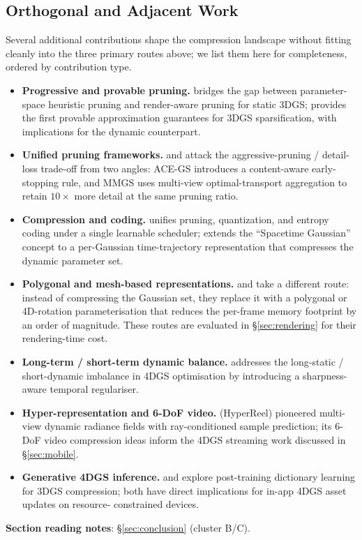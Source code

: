 \subsection{Orthogonal and Adjacent Work}
Several additional contributions shape the compression landscape
without fitting cleanly into the three primary routes above; we
list them here for completeness, ordered by contribution type.
\begin{itemize}
  \item \textbf{Progressive and provable pruning.}
        \cite{chen2026refine} bridges the gap between
        parameter-space heuristic pruning and render-aware pruning
        for static 3DGS; \cite{mousa2026provablepruning} provides
        the first provable approximation guarantees for 3DGS
        sparsification, with implications for the dynamic
        counterpart.
  \item \textbf{Unified pruning frameworks.}
        \cite{zhao2026acegs} and \cite{zhao2026mmgs} attack the
        aggressive-pruning / detail-loss trade-off from two
        angles: ACE-GS introduces a content-aware early-stopping
        rule, and MMGS uses multi-view optimal-transport
        aggregation to retain $10\times$ more detail at the same
        pruning ratio.
  \item \textbf{Compression and coding.}
        \cite{zhang2026geta3dgs} unifies pruning, quantization, and
        entropy coding under a single learnable scheduler;
        \cite{li2024spacetimegaussians} extends the
        ``Spacetime Gaussian'' concept to a per-Gaussian
        time-trajectory representation that compresses the dynamic
        parameter set.
  \item \textbf{Polygonal and mesh-based representations.}
        \cite{hong2026polymerge} and \cite{duan20244drotorgs}
        take a different route: instead of compressing the
        Gaussian set, they replace it with a polygonal or 4D-rotation
        parameterisation that reduces the per-frame memory footprint
        by an order of magnitude. These routes are evaluated in
        \S\ref{sec:rendering} for their rendering-time cost.
  \item \textbf{Long-term / short-term dynamic balance.}
        \cite{liao2026sharptimegs} addresses the long-static /
        short-dynamic imbalance in 4DGS optimisation by introducing
        a sharpness-aware temporal regulariser.
  \item \textbf{Hyper-representation and 6-DoF video.}
        \cite{attal2023hyperreel} (HyperReel) pioneered
        multi-view dynamic radiance fields with
        ray-conditioned sample prediction; its 6-DoF video
        compression ideas inform the 4DGS streaming work
        discussed in \S\ref{sec:mobile}.
  \item \textbf{Generative 4DGS inference.}
        \cite{poirier2026gintergray} and
        \cite{gong2026dict3dgs} explore post-training dictionary
        learning for 3DGS compression; both have direct
        implications for in-app 4DGS asset updates on resource-
        constrained devices.
\end{itemize}

\bigskip
\noindent\textbf{Section reading notes}:
\S\ref{sec:conclusion} (cluster B/C).
